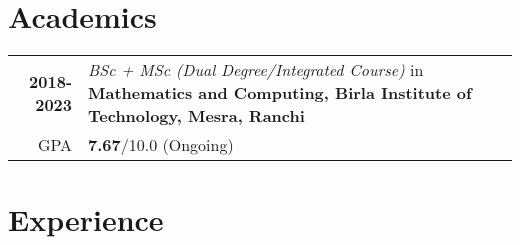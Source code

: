 \documentclass[a4paper,10pt]{extarticle} %
\begin{document}
\vspace{-0.4cm}
\section{\textcolor{primary}{Academics}}

\begin{tabular}{r|p{17.5cm}}	
\textbf{2018-2023} & \textit{BSc + MSc (Dual Degree/Integrated Course)} in \textbf{Mathematics and Computing, Birla Institute of Technology, Mesra, Ranchi}\\
\hfill GPA & \textbf{7.67}/10.0 (Ongoing)\\
\end{tabular}

\vspace{-0.3cm}
\section{\textcolor{primary}{Experience}}
\end{document}
